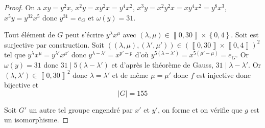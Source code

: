 \begin{proof}
	On a $xy=y^{2}x$, $x^{2}y=xy^{2}x=y^{4}x^{2}$, $x^{3}y=x^{2}y^{2}x=xy^{4}x^{2}=y^{8}x^{3}$, $x^{5}y=y^{32}x^{5}$ donc $y^{31}=e_{G}$ et $\omega(y)=31$. 
	
	Tout élément de $G$ peut s'écrire $y^{\lambda}x^{\mu}$ avec $\left(\lambda,\mu\right)\in\left\llbracket 0,30\right\rrbracket \times\left\{0, 4\right\}$. Soit  est surjective par construction. Soit $((\lambda,\mu),(\lambda',\mu'))\in(\left\llbracket 0,30\right\rrbracket\times\left\llbracket 0, 4\right\rrbracket)^{2}$ tel que $y^{\lambda}x^{\mu}=y^{\lambda'}x^{\mu'}$ donc $y^{\lambda-\lambda'}=x^{p'-p}$ d'où $y^{5(\lambda-\lambda')}=x^{5(\mu'-\mu)}=e_{G}$. Or $\omega(y)=31$ donc $31\mid 5(\lambda-\lambda')$ et d'après le théorème de Gauss, $31\mid \lambda-\lambda'$. Or $(\lambda,\lambda')\in\left\llbracket 0,30\right\rrbracket^{2}$ donc $\lambda=\lambda'$ et de même $\mu=\mu'$ donc $f$ est injective donc bijective et 
	\begin{equation}
		\boxed{\vert G\vert=155}
	\end{equation}
	
	Soit $G'$ un autre tel groupe engendré par $x'$ et $y'$, on forme 
	et on vérifie que $g$ est un isomorphisme.
\end{proof}

